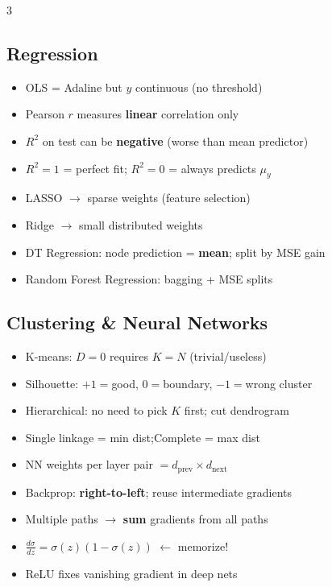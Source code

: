 \documentclass[8pt,letterpaper]{extarticle}
\begin{document}
\begin{multicols}{3}
\subsection{Regression}
\begin{itemize}
  \item OLS = Adaline but $y$ continuous (no threshold)
  \item Pearson $r$ measures \textbf{linear} correlation only
  \item $R^2$ on test can be \textbf{negative} (worse than mean predictor)
  \item $R^2{=}1$ = perfect fit; $R^2{=}0$ = always predicts $\mu_y$
  \item LASSO $\to$ sparse weights (feature selection)
  \item Ridge $\to$ small distributed weights
  \item DT Regression: node prediction = \textbf{mean}; split by MSE gain
  \item Random Forest Regression: bagging + MSE splits
\end{itemize}

\subsection{Clustering \& Neural Networks}
\begin{itemize}
  \item K-means: $D=0$ requires $K=N$ (trivial/useless)
  \item Silhouette: $+1{=}$good, $0{=}$boundary, $-1{=}$wrong cluster
  \item Hierarchical: no need to pick $K$ first; cut dendrogram
  \item Single linkage = min dist;\quad Complete = max dist
  \item NN weights per layer pair $= d_\text{prev} \times d_\text{next}$
  \item Backprop: \textbf{right-to-left}; reuse intermediate gradients
  \item Multiple paths $\to$ \textbf{sum} gradients from all paths
  \item $\frac{d\sigma}{dz} = \sigma(z)(1-\sigma(z))$ \quad $\leftarrow$ memorize!
  \item ReLU fixes vanishing gradient in deep nets
\end{itemize}

\end{multicols}
\end{document}
